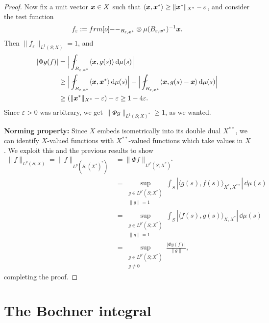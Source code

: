 \begin{proof}
  Now fix a unit vector $\bm{x} \in X$ such that $\langle \bm{x}, \bm{x}^* \rangle \geq \|\bm{x}^*\|_{X^*} - \varepsilon$, and consider the test function
  \begin{equation*}
    f_{\varepsilon} := \1_{B_{\varepsilon, \mb{x}^*}} \otimes \mu(B_{\varepsilon, \mb{x}^*})^{-1} \mb{x}.
  \end{equation*}
  Then $\|f_{\varepsilon}\|_{L^1(S;X)} = 1$, and
  \begin{equation*}
    \begin{aligned}
      |\Phi g(f)| &=  \Big| \fint_{B_{\varepsilon, \mb{x}^*}} \langle \mb{x}, g(s) \rangle \, \dd\mu(s) \Big| \\
      &\geq \Big| \fint_{B_{\varepsilon, \mb{x}^*}} \langle \mb{x}, \mb{x}^* \rangle \, \dd\mu(s) \Big| - \Big| \fint_{B_{\varepsilon, \mb{x}^*}} \langle \mb{x}, g(s) - \mb{x} \rangle  \, \dd\mu(s) \Big| \\
      &\geq (\|\mb{x}^*\|_{X^*} - \varepsilon) - \varepsilon \geq 1 - 4\varepsilon.
    \end{aligned}
  \end{equation*}
  Since $\varepsilon > 0$ was arbitrary, we get $\|\Phi g\|_{L^1(S;X)^*} \geq 1$, as we wanted.

  \textbf{Norming property:}
  Since $X$ embeds isometrically into its double dual $X^{**}$, we can identify $X$-valued functions with $X^{**}$-valued functions which take values in $X$.
  We exploit this and the previous results to show
  \begin{equation*}
    \begin{aligned}
      \|f\|_{L^p(S;X)} = \|f\|_{L^p(S;(X^*)^*)} &= \|\Phi f\|_{L^{p'}(S; X^*)^*} \\
      &= \sup_{\substack{g \in L^{p'}(S;X^*) \\ \|g\| = 1}} \int_{S} |\langle g(s) , f(s) \rangle_{X^*, X^{**}}| \, \dd\mu(s) \\
      &= \sup_{\substack{g \in L^{p'}(S;X^*) \\ \|g\| = 1}} \int_{S} |\langle f(s) , g(s) \rangle_{X, X^*}| \, \dd\mu(s) \\
      &= \sup_{\substack{g \in L^{p'}(S;X^*) \\ g \neq 0}} \frac{|\Phi g(f)|}{\|g\|},
    \end{aligned}
  \end{equation*}
  completing the proof.
\end{proof}

\section{The Bochner integral}

